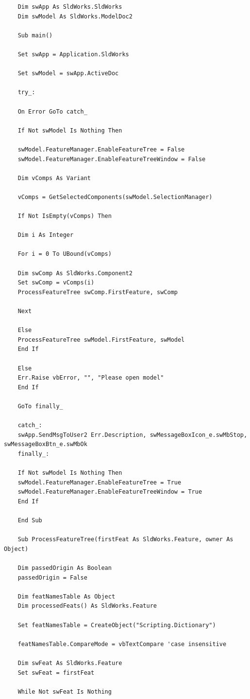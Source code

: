 \documentclass[12pt,letterpaper,final]{report}
\begin{document}
\begin{lstlisting}
	Dim swApp As SldWorks.SldWorks
	Dim swModel As SldWorks.ModelDoc2
	
	Sub main()
	
	Set swApp = Application.SldWorks
	
	Set swModel = swApp.ActiveDoc
	
	try_:
	
	On Error GoTo catch_
	
	If Not swModel Is Nothing Then
	
	swModel.FeatureManager.EnableFeatureTree = False
	swModel.FeatureManager.EnableFeatureTreeWindow = False
	
	Dim vComps As Variant
	
	vComps = GetSelectedComponents(swModel.SelectionManager)
	
	If Not IsEmpty(vComps) Then
	
	Dim i As Integer
	
	For i = 0 To UBound(vComps)
	
	Dim swComp As SldWorks.Component2
	Set swComp = vComps(i)
	ProcessFeatureTree swComp.FirstFeature, swComp
	
	Next
	
	Else
	ProcessFeatureTree swModel.FirstFeature, swModel
	End If
	
	Else
	Err.Raise vbError, "", "Please open model"
	End If
	
	GoTo finally_
	
	catch_:
	swApp.SendMsgToUser2 Err.Description, swMessageBoxIcon_e.swMbStop, swMessageBoxBtn_e.swMbOk
	finally_:
	
	If Not swModel Is Nothing Then
	swModel.FeatureManager.EnableFeatureTree = True
	swModel.FeatureManager.EnableFeatureTreeWindow = True
	End If
	
	End Sub
	
	Sub ProcessFeatureTree(firstFeat As SldWorks.Feature, owner As Object)
	
	Dim passedOrigin As Boolean
	passedOrigin = False
	
	Dim featNamesTable As Object
	Dim processedFeats() As SldWorks.Feature
	
	Set featNamesTable = CreateObject("Scripting.Dictionary")
	
	featNamesTable.CompareMode = vbTextCompare 'case insensitive
	
	Dim swFeat As SldWorks.Feature
	Set swFeat = firstFeat
	
	While Not swFeat Is Nothing
	

\end{lstlisting}
\end{document}
